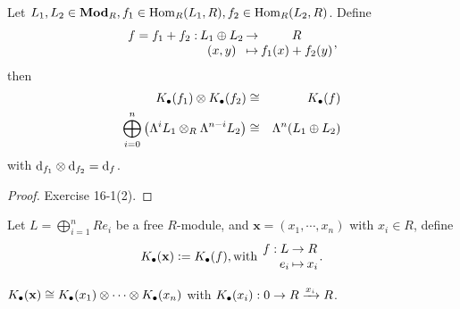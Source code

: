 \begin{prop}
  Let $L_1, L_2 \in \mathbf{Mod}_R, f_1 \in \operatorname{Hom}_R(L_1, R), f_2 \in \operatorname{Hom}_R(L_2, R)$.
  Define
  $$\deffunc{f = f_1 + f_2}{L_1 \Op L_2}{R}{(x, y)}{f_1(x) + f_2(y)}, $$
  then 
  \begin{eqnarray*}
    K_\bullet(f_1) \otimes K_\bullet(f_2) &\cong& K_\bullet(f) \\
    \bigoplus\limits_{i=0}^n\left(\Lambda^i L_1 \otimes_R \Lambda^{n-i} L_2\right)
    &\cong& \Lambda^n(L_1 \oplus L_2)
  \end{eqnarray*}
  with
  $\mathrm{d}_{f_1} \otimes \mathrm{d}_{f_2} = \mathrm{d}_f$.

  \begin{proof}
    Exercise 16-1(2).
  \end{proof}
\end{prop}

\begin{definition}
  Let $L = \bigoplus\limits_{i=1}^n R e_i$ be a free $R$-module, and 
  $\mathbf{x} =(x_1, \cdots, x_n)$ with $x_i \in R$, define
  $$
  K_\bullet(\mathbf{x}) \defeq K_\bullet(f), \textrm{with }
  \deffunc{f}{L}{R}{e_i}{x_i}.
  $$
\end{definition}

\begin{coro}
  $K_\bullet(\mathbf{x}) \cong K_\bullet(x_1) \otimes \cdots \otimes K_\bullet(x_n)$
  with 
  $K_\bullet(x_i) : 0 \to R \xrightarrow{x_i} R$.
\end{coro}

